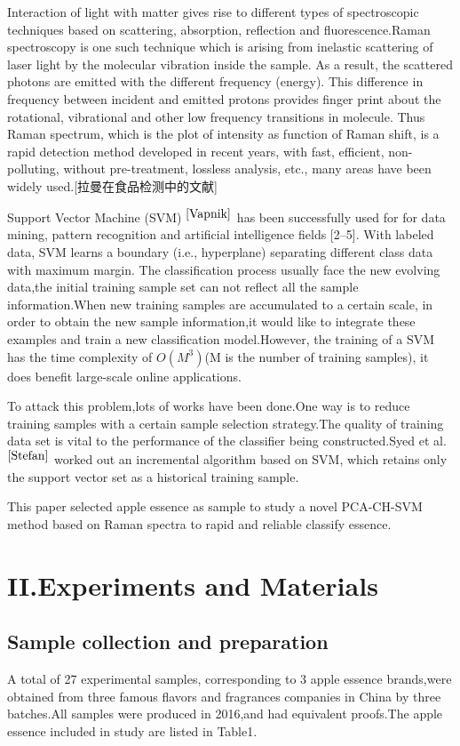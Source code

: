 \documentclass[a4paper]{article}
\begin{document}
Interaction of light with matter gives rise to different types of spectroscopic techniques based on scattering, absorption, reflection and fluorescence.Raman spectroscopy is one such technique which is arising from inelastic scattering of laser light by the molecular vibration inside the sample. As a result, the scattered photons are emitted with the different frequency (energy). This difference in frequency between incident and emitted protons provides finger print about the rotational, vibrational and other low frequency transitions in molecule. Thus Raman spectrum, which is the plot of intensity as function of Raman shift, is a rapid detection method developed in recent years, with fast, efficient, non-polluting, without pre-treatment, lossless analysis, etc., many areas have been widely used.[拉曼在食品检测中的文献]

Support Vector Machine (SVM) $^{\cite{Vapnik}}$ has been successfully used for for data mining, pattern recognition and artiﬁcial intelligence ﬁelds [2–5]. With labeled data, SVM learns a boundary (i.e., hyperplane) separating different class data with maximum margin.
The classification process usually face the new evolving data,the initial training sample set can not reflect all the sample information.When new training samples are accumulated to a certain scale, in order to obtain the new sample information,it would like to integrate these examples and train a new classification model.However, the training of a SVM has the time complexity of $O(M^3)$(M is the number of training samples), it does benefit large-scale online applications.

To attack this problem,lots of works have been done.One way is to reduce training samples with a certain sample selection strategy.The quality of training data set is vital to the performance of the classifier being constructed.Syed et al.$ ^{\cite{Stefan}}$ worked out an incremental algorithm based on SVM, which retains only the support vector set as a historical training sample.

This paper selected apple essence as sample to study a novel PCA-CH-SVM method based on Raman spectra to rapid and reliable classify essence.
\section{II.Experiments and Materials}
\subsection{Sample collection and preparation}
A total of 27 experimental samples, corresponding to 3 apple essence brands,were obtained from three famous flavors and fragrances companies in China by three batches.All samples were produced in 2016,and had equivalent proofs.The apple essence included in study are listed in Table1.
\end{document}
